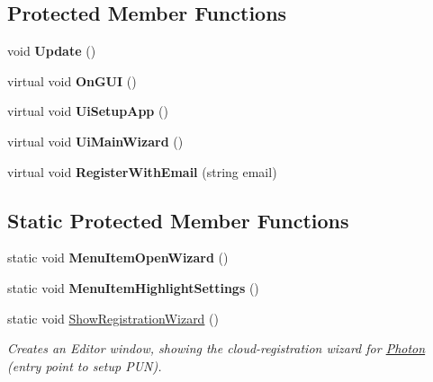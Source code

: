 \subsection*{Protected Member Functions}
\begin{DoxyCompactItemize}
\item 
void {\bfseries Update} ()\hypertarget{class_photon_editor_a035ff54f0df0948ded82c1a88e71bc02}{}\label{class_photon_editor_a035ff54f0df0948ded82c1a88e71bc02}

\item 
virtual void {\bfseries On\+G\+UI} ()\hypertarget{class_photon_editor_afeb90511f45192da4b7654644174b8d3}{}\label{class_photon_editor_afeb90511f45192da4b7654644174b8d3}

\item 
virtual void {\bfseries Ui\+Setup\+App} ()\hypertarget{class_photon_editor_a1aee5f81fae639aa8a67db8c359bbe7b}{}\label{class_photon_editor_a1aee5f81fae639aa8a67db8c359bbe7b}

\item 
virtual void {\bfseries Ui\+Main\+Wizard} ()\hypertarget{class_photon_editor_a4afcc2726df4ffcd3a97ec353bb0cdb8}{}\label{class_photon_editor_a4afcc2726df4ffcd3a97ec353bb0cdb8}

\item 
virtual void {\bfseries Register\+With\+Email} (string email)\hypertarget{class_photon_editor_a8168d66be6b6ccfe327d650436aaf773}{}\label{class_photon_editor_a8168d66be6b6ccfe327d650436aaf773}

\end{DoxyCompactItemize}
\subsection*{Static Protected Member Functions}
\begin{DoxyCompactItemize}
\item 
static void {\bfseries Menu\+Item\+Open\+Wizard} ()\hypertarget{class_photon_editor_a86bf73b728f6a806a228d940ead16b4c}{}\label{class_photon_editor_a86bf73b728f6a806a228d940ead16b4c}

\item 
static void {\bfseries Menu\+Item\+Highlight\+Settings} ()\hypertarget{class_photon_editor_a689f6bb781fe29abe03e215b2b9b0f5f}{}\label{class_photon_editor_a689f6bb781fe29abe03e215b2b9b0f5f}

\item 
static void \hyperlink{class_photon_editor_ad09432c402050476d88efc81e81f7595}{Show\+Registration\+Wizard} ()
\begin{DoxyCompactList}\small\item\em Creates an Editor window, showing the cloud-\/registration wizard for \hyperlink{namespace_photon}{Photon} (entry point to setup P\+UN).\end{DoxyCompactList}\end{DoxyCompactItemize}
